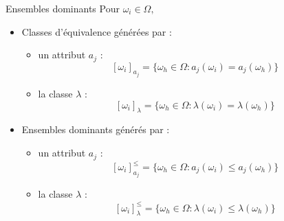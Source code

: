 \documentclass[usenames,dvipsnames]{beamer}
\begin{document}
\begin{frame}{Ensembles dominants}
Pour $\omega_i \in \Omega,$
\begin{itemize}
\item Classes d'équivalence générées par : 
\begin{itemize}
\item un attribut $a_j$ : $$[\omega_i]_{a_j} = \{\omega_h \in \Omega : a_j(\omega_i) = a_j(\omega_h)\}$$
\item la classe $\lambda$ : $$[\omega_i]_{\lambda} = \{\omega_h \in \Omega : \lambda(\omega_i) = \lambda(\omega_h)\}$$
\end{itemize}

\item Ensembles dominants générés par :
\begin{itemize}
\item un attribut $a_j$ : $$[\omega_i]^{\leq}_{a_j} = \{\omega_h \in \Omega : a_j(\omega_i) \leq a_j(\omega_h)\}$$
\item la classe $\lambda$ : $$[\omega_i]^{\leq}_{\lambda} = \{\omega_h \in \Omega : \lambda(\omega_i) \leq \lambda(\omega_h)\}$$
\end{itemize}

\end{itemize}
\end{frame}

%
%
%
%
%
%
%
%
\end{document}
